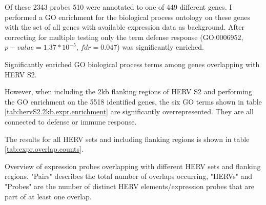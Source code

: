 \documentclass[a4paper,12pt,twoside,openright]{article}
\begin{document}
Of these 2343 probes 510 were annotated to one of 449 different genes. I performed a GO enrichment for the biological process ontology on these genes with the set of all genes with available expression data as background. After correcting for multiple testing only the term defense response (GO:0006952, $p-value=1.37*10^{-5}$, $fdr=0.047$) was significantly enriched.

\begin{table}[h!]
  \begin{center}
  \end{center}        
	\caption{Significantly enriched GO biological process terms among genes overlapping with HERV S2.}
	\label{tab:hervS2.2kb.expr.enrichment}
\end{table}

However, when including the 2kb flanking regions of HERV S2 and performing the GO enrichment on the 5518 identified genes, the six GO terms shown in table \ref{tab:hervS2.2kb.expr.enrichment} are significantly overrepresented. They are all connected to defense or immune response.

The results for all HERV sets and including flanking regions is shown in table \ref{tab:expr.overlap.counts}.

\begin{table}[h!]
  \begin{center}
  \end{center}        
	\caption{Overview of expression probes overlapping with different HERV sets and flanking regions. "Pairs" describes the total number of overlaps occurring, "HERVs" and "Probes" are the number of distinct HERV elements/expression probes that are part of at least one overlap.}
	\label{tab:expr.overlap.counts}
\end{table}
\end{document}
